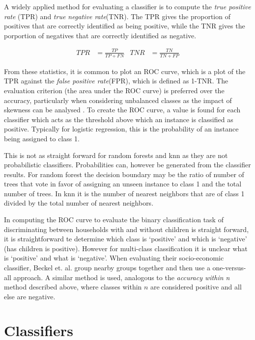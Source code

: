 A widely applied method for evaluating a classifier is to compute the \textit{true positive rate} (TPR) and \textit{true negative rate}(TNR). The TPR gives the proportion of positives that are correctly identified as being positive, while the TNR gives the porportion of negatives that are correctly identified as negative.

\begin{align*}
TPR&=\frac{TP}{TP+FN}   &   TNR&=\frac{TN}{TN+FP}   
\end{align*}

From these statistics, it is common to plot an ROC curve, which is a plot of the TPR against the \textit{false positive rate}(FPR), which is defined as 1-TNR. The evaluation criterion (the area under the ROC curve) is preferred over the accuracy, particularly when considering unbalanced classes as the impact of skewness can be analysed \cite{Waegeman}. To create the ROC curve, a value is found for each classifier which acts as the threshold above which an instance is classified as positive. Typically for logistic regression, this is the probability of an instance being assigned to class 1.

This is not as straight forward for random forests and knn as they are not probabilistic classifiers. Probabilities can, however be generated from the classifier results. For random forest the decision boundary may be the ratio of number of trees that vote in favor of assigning an unseen instance to class 1 and the total number of trees. In knn it is the number of nearest neighbors that are of class 1 divided by the total number of nearest neighbors.

In computing the ROC curve to evaluate the binary classification task of discriminating between households with and without children is straight forward, it is straightforward te determine which class is `positive' and which is `negative' (has children is positive). However for multi-class classification it is unclear what is `positive' and what is `negative'. When evaluating their socio-economic classifier, Beckel et. al. group nearby groups together and then use a one-versus-all approach\cite{Beckel_2,Beckel_3}. A similar method is used, analogous to the \textit{accuracy within n} method described above, where classes within $n$ are considered positive and all else are negative.



\section{Classifiers}